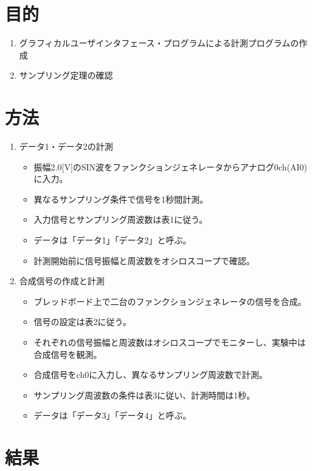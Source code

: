 \documentclass[a4paper,11pt,xelatex,ja=standard]{bxjsarticle}
\begin{document}
\section{目的}
    \begin{enumerate}
        \item グラフィカルユーザインタフェース・プログラムによる計測プログラムの作成
        \item サンプリング定理の確認
    \end{enumerate}

\section{方法}

    \begin{enumerate}
        \item データ1・データ2の計測
        \begin{itemize}
            \item 振幅2.0[V]のSIN波をファンクションジェネレータからアナログ0ch(AI0)に入力。
            \item 異なるサンプリング条件で信号を1秒間計測。
            \item 入力信号とサンプリング周波数は表1に従う。
            \item データは「データ1」「データ2」と呼ぶ。
            \item 計測開始前に信号振幅と周波数をオシロスコープで確認。
        \end{itemize}
        \item 合成信号の作成と計測
        \begin{itemize}
            \item ブレッドボード上で二台のファンクションジェネレータの信号を合成。
            \item 信号の設定は表2に従う。
            \item それぞれの信号振幅と周波数はオシロスコープでモニターし、実験中は合成信号を観測。
            \item 合成信号をch0に入力し、異なるサンプリング周波数で計測。
            \item サンプリング周波数の条件は表3に従い、計測時間は1秒。
            \item データは「データ3」「データ4」と呼ぶ。
        \end{itemize}
    \end{enumerate}
    
\section{結果}
\end{document}
